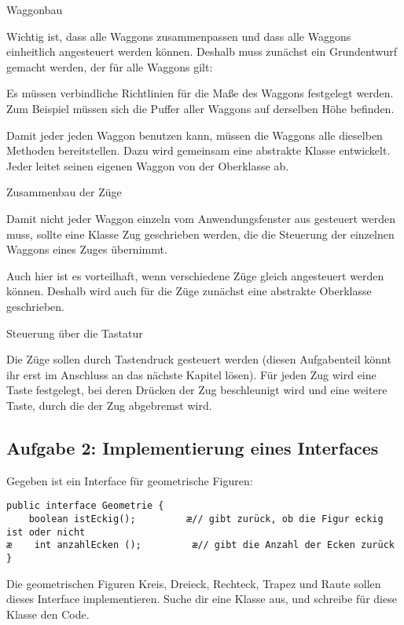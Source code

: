 \begin{compactenum}[1.]
\item Waggonbau

Wichtig ist, dass alle Waggons zusammenpassen und dass alle Waggons einheitlich
angesteuert werden können. Deshalb muss zunächst ein Grundentwurf gemacht
werden, der für alle Waggons gilt:
\begin{compactenum}[a)]
\item Es müssen verbindliche Richtlinien für die Maße des Waggons festgelegt
werden. Zum Beispiel müssen sich die Puffer aller Waggons auf derselben Höhe
befinden.
\item Damit jeder jeden Waggon benutzen kann, müssen die Waggons alle dieselben
Methoden bereitstellen. Dazu wird gemeinsam eine abstrakte Klasse 
entwickelt. Jeder leitet seinen eigenen Waggon von der Oberklasse
 ab.
\end{compactenum}

\item Zusammenbau der Züge

Damit nicht jeder Waggon einzeln vom Anwendungsfenster aus gesteuert werden
muss, sollte eine Klasse Zug geschrieben werden, die die Steuerung der
einzelnen Waggons eines Zuges übernimmt.

Auch hier ist es vorteilhaft, wenn verschiedene Züge gleich angesteuert werden
können. Deshalb wird auch für die Züge zunächst eine abstrakte Oberklasse
geschrieben.

\item Steuerung über die Tastatur

Die Züge sollen durch Tastendruck gesteuert werden (diesen Aufgabenteil könnt
ihr erst im Anschluss an das nächste Kapitel lösen). Für jeden Zug wird eine
Taste festgelegt, bei deren Drücken der Zug beschleunigt wird und eine weitere
Taste, durch die der Zug abgebremst wird.
\end{compactenum}


\subsection{Aufgabe 2: Implementierung eines Interfaces}

Gegeben ist ein Interface für geometrische Figuren:

\begin{lstlisting}
public interface Geometrie {
    boolean istEckig();         æ// gibt zurück, ob die Figur eckig ist oder nicht 
æ    int anzahlEcken ();         æ// gibt die Anzahl der Ecken zurück
}
\end{lstlisting}

Die geometrischen Figuren Kreis, Dreieck, Rechteck, Trapez und Raute sollen
dieses Interface implementieren. Suche dir eine Klasse aus, und schreibe für
diese Klasse den Code.

